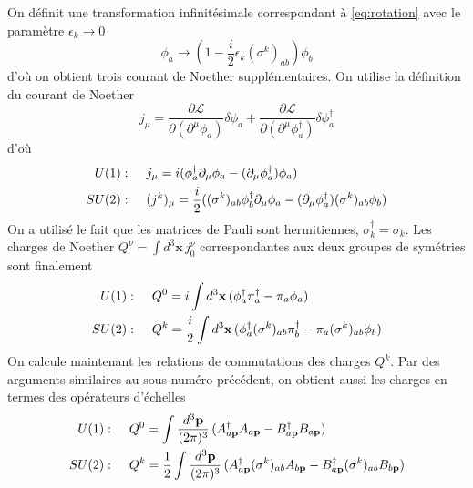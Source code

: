 \documentclass{article}
\numberwithin{equation}{section}
\begin{document}
On définit une transformation infinitésimale correspondant à \eqref{eq:rotation} avec le paramètre $\epsilon_{k} \rightarrow 0$
\begin{equation}
        \phi_a \rightarrow (1 - \frac{i}{2}\epsilon_{k} (\sigma^k)_{ab} )\phi_b
\end{equation} 
d'où on obtient trois courant de Noether supplémentaires. On utilise la définition du courant de Noether
\begin{equation}
        j_\mu = \frac{\partial \mathcal{L}}{\partial (\partial^\mu \phi_a)} \delta\phi_a + \frac{\partial \mathcal{L}}{\partial (\partial^{\mu} \phi^{\dagger}_a)}\delta \phi^{\dagger}_a  
\end{equation} 
d'où
\begin{align}
        U(1):&\hspace{.5cm} j_\mu = i(\phi_a^{\dagger}\partial_\mu \phi_a - (\partial_\mu \phi^{\dagger}_a) \phi_a) \\
        SU(2):&\hspace{.5cm} (j^{k})_\mu = \frac{i}{2} ((\sigma^{k})_{ab}\phi_b^{\dagger}\partial_\mu \phi_a - (\partial_\mu \phi^{\dagger}_a) (\sigma^{k})_{ab}\phi_b) 
\end{align}
On a utilisé le fait que les matrices de Pauli sont hermitiennes, $\sigma_k^{\dagger} = \sigma_k$. 
Les charges de Noether $Q^{\nu} = \int d^{3}\mathbf{x}\, j_0^{\nu}$ correspondantes aux deux groupes de symétries sont finalement
\begin{align}
        U(1):&\hspace{.5cm} Q^{0} =  i\int d^{3}\mathbf{x}\,  (\phi_a^{\dagger} \pi_a^{\dagger} - \pi_a \phi_a)\\
        SU(2):&\hspace{.5cm} Q^{k} = \frac{i}{2}\int d^{3}\mathbf{x}\, (\phi_a^{\dagger}(\sigma^{k})_{ab}\pi^{\dagger}_b -  \pi_a (\sigma^{k})_{ab}\phi_b) 
\end{align}
On calcule maintenant les relations de commutations des charges $Q^{k}$. 
Par des arguments similaires au sous numéro précédent, on obtient aussi les charges en termes des opérateurs d'échelles
\begin{align}
        U(1):&\hspace{.5cm} Q^{0} =  \int \frac{d^{3}\mathbf{p}}{(2\pi)^{3}}\,  (A^{\dagger}_{a \mathbf{p}}A_{a \mathbf{p}} - B^{\dagger}_{a \mathbf{p}}B_{a \mathbf{p}})\\
        SU(2):&\hspace{.5cm} Q^{k} = \frac{1}{2}\int \frac{d^{3}\mathbf{p}}{(2\pi)^{3}}\, (A^{\dagger}_{a\mathbf{p}}(\sigma^{k})_{ab} A_{b \mathbf{p}} 
        -  B^{\dagger}_{a \mathbf{p}} (\sigma^{k})_{ab}B_{b \mathbf{p}}) 
\end{align}
\end{document}
